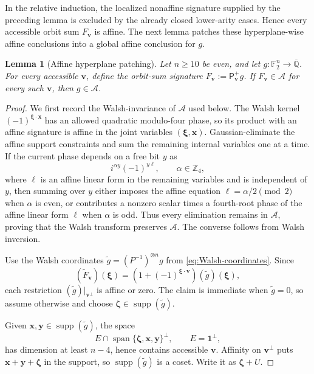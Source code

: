 \documentclass[11pt,letterpaper,onecolumn]{article}
\theoremstyle{plain}
\newtheorem{lemma}[lemma]{Lemma}
\theoremstyle{definition}
\theoremstyle{remark}
\newcommand{\AlgNums}{\overline{\mathbb Q}}
\newcommand{\Ftwo}{\mathbb F_2}
\newcommand{\cA}{\mathscr A}
\newcommand{\Span}{\operatorname{span}}
\newcommand{\supp}{\operatorname{supp}}
\newcommand{\one}{\mathbf 1}
\begin{document}
In the relative induction, the localized nonaffine signature supplied by the
preceding lemma is excluded by the already closed lower-arity cases.  Hence
every accessible orbit sum \(F_{\mathbf{v}}\) is affine.  The next lemma patches these
hyperplane-wise affine conclusions into a global affine conclusion for
\(g\).

\begin{lemma}[Affine hyperplane patching]
\label{lem:rm-affine-hyperplane-patching}
Let \(n\ge10\) be even, and let \(g:\Ftwo^n\to\AlgNums\).  For every
accessible \({\mathbf{v}}\), define the orbit-sum signature
\(F_{\mathbf{v}}:=\mathsf P_{\mathbf{v}}^+g\).  If \(F_{\mathbf{v}}\in\cA\) for every such \({\mathbf{v}}\),
then \(g\in\cA\).
\end{lemma}

\begin{proof}
We first record the Walsh-invariance of \(\cA\) used below.  The Walsh
kernel \((-1)^{{\boldsymbol{\xi}}\cdot {\mathbf{x}}}\) has an allowed quadratic modulo-four phase,
so its product with an affine signature is affine in the joint variables
\(({\boldsymbol{\xi}},{\mathbf{x}})\).  Gaussian-eliminate the affine support constraints and sum
the remaining internal variables one at a time.  If the current phase
depends on a free bit \(y\) as
\[
 i^{\alpha y}(-1)^{y\ell},
 \qquad \alpha\in\mathbb Z_4,
\]
where \(\ell\) is an affine linear form in the remaining variables and is
independent of \(y\),
then summing over \(y\) either imposes the affine equation
\(\ell=\alpha/2\pmod2\) when \(\alpha\) is even, or contributes a nonzero
scalar times a fourth-root phase of the affine linear form \(\ell\) when
\(\alpha\) is odd.  Thus every elimination remains in \(\cA\), proving
that the Walsh transform preserves \(\cA\).  The converse follows from
Walsh inversion.

Use the Walsh coordinates \(\widetilde g=(P^{-1})^{\otimes n}g\) from
\cref{eq:Walsh-coordinates}. Since
\begin{equation*}
  (\widetilde F_{\mathbf{v}})({\boldsymbol{\xi}})
  =(1+(-1)^{{\boldsymbol{\xi}}\cdot {\mathbf{v}}})(\widetilde g)({\boldsymbol{\xi}}),
\end{equation*}
each restriction \((\widetilde g)|_{{\mathbf{v}}^\perp}\) is affine or zero.  The claim
is immediate when \(\widetilde g=0\), so assume otherwise and choose
\({\boldsymbol{\zeta}}\in\supp (\widetilde g)\).

Given \({\mathbf{x}},{\mathbf{y}}\in\supp (\widetilde g)\), the space
\[
  E\cap\Span\{{\boldsymbol{\zeta}},{\mathbf{x}},{\mathbf{y}}\}^\perp,
  \qquad E=\one^\perp,
\]
has dimension at least \(n-4\), hence contains accessible \({\mathbf{v}}\).  Affinity
on \({\mathbf{v}}^\perp\) puts \({\mathbf{x}}+{\mathbf{y}}+{\boldsymbol{\zeta}}\) in the support, so
\(\supp (\widetilde g)\) is a
coset. Write it as \({\boldsymbol{\zeta}}+U\).


\end{proof}
\end{document}
